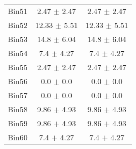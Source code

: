 \begin{tabular}{|c|c|c|}
     Bin51 & 2.47 $\pm$ 2.47 & 2.47 $\pm$ 2.47 \\ \cline{1-3} 
     Bin52 & 12.33 $\pm$ 5.51 & 12.33 $\pm$ 5.51 \\ \cline{1-3} 
     Bin53 & 14.8 $\pm$ 6.04 & 14.8 $\pm$ 6.04 \\ \cline{1-3} 
     Bin54 & 7.4 $\pm$ 4.27 & 7.4 $\pm$ 4.27 \\ \cline{1-3} 
     Bin55 & 2.47 $\pm$ 2.47 & 2.47 $\pm$ 2.47 \\ \cline{1-3} 
     Bin56 & 0.0 $\pm$ 0.0 & 0.0 $\pm$ 0.0 \\ \cline{1-3} 
     Bin57 & 0.0 $\pm$ 0.0 & 0.0 $\pm$ 0.0 \\ \cline{1-3} 
     Bin58 & 9.86 $\pm$ 4.93 & 9.86 $\pm$ 4.93 \\ \cline{1-3} 
     Bin59 & 9.86 $\pm$ 4.93 & 9.86 $\pm$ 4.93 \\ \cline{1-3} 
     Bin60 & 7.4 $\pm$ 4.27 & 7.4 $\pm$ 4.27 \\ \cline{1-3} 
  \end{tabular}
